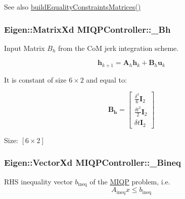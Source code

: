 \begin{DoxySeeAlso}{\-See also}
\hyperlink{classMIQPController_a870c7d3c0e5fcfd46f7bb95924007082}{build\-Equality\-Constraints\-Matrices()} 
\end{DoxySeeAlso}
\hypertarget{classMIQPController_a9a989875871a898f0ad19b441a2c67ba}{
\subsubsection[{\-\_\-\-Bh}]{\setlength{\rightskip}{0pt plus 5cm}\-Eigen\-::\-Matrix\-Xd {\bf \-M\-I\-Q\-P\-Controller\-::\-\_\-\-Bh}}}\label{classMIQPController_a9a989875871a898f0ad19b441a2c67ba}
\-Input \-Matrix $B_h$ from the \-Co\-M jerk integration scheme.

\[ \mathbf{h}_{k+1} = \mathbf{A}_h \mathbf{h}_k + \mathbf{B}_h \mathbf{u}_k \]

\-It is constant of size $6\times2$ and equal to\-:

\[ \mathbf{B_h} = \left[ \begin{array}{c} \frac{\delta^3}{6}\mathbf{I}_2 \\ \frac{\delta t^2}{2} \mathbf{I}_2 \\ \delta t \mathbf{I}_2 \end{array} \right] \]

\-Size\-: $[6\times2]$ \hypertarget{classMIQPController_a02d441467a51e81e969163f096d3798a}{
\subsubsection[{\-\_\-\-Bineq}]{\setlength{\rightskip}{0pt plus 5cm}\-Eigen\-::\-Vector\-Xd {\bf \-M\-I\-Q\-P\-Controller\-::\-\_\-\-Bineq}}}\label{classMIQPController_a02d441467a51e81e969163f096d3798a}
\-R\-H\-S inequality vector $b_{\text{ineq}}$ of the \hyperlink{namespaceMIQP}{\-M\-I\-Q\-P} problem, i.\-e. \[ A_{\text{ineq}} x \leq b_{\text{ineq}} \]


